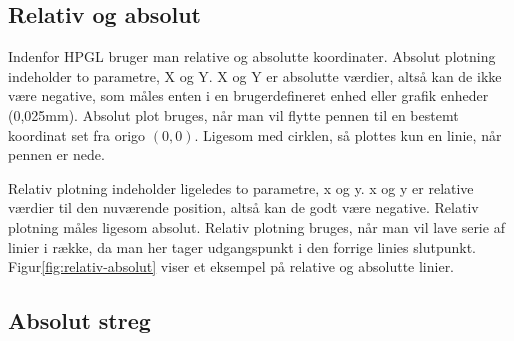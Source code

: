 \subsection{Relativ og absolut}

Indenfor HPGL bruger man relative og absolutte koordinater. Absolut
plotning indeholder to parametre, X og Y. X og Y er absolutte værdier,
altså kan de ikke være negative, som måles enten i en brugerdefineret
enhed eller grafik enheder (0,025mm). Absolut plot bruges, når man vil
flytte pennen til en bestemt koordinat set fra origo $(0, 0)$. Ligesom
med cirklen, så plottes kun en linie, når pennen er nede.


Relativ plotning indeholder ligeledes to parametre, x og y. x og y er
relative værdier til den nuværende position, altså kan de godt være
negative. Relativ plotning måles ligesom absolut. Relativ plotning
bruges, når man vil lave serie af linier i række, da man her tager
udgangspunkt i den forrige linies
slutpunkt. Figur\vref{fig:relativ-absolut} viser et eksempel på
relative og absolutte linier.


\subsection{Absolut streg}

